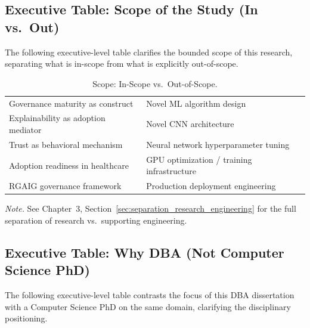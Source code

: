 \subsection{Executive Table: Scope of the Study (In vs.\ Out)}
\label{sec:exec_scope}

\noindent The following executive-level table clarifies the bounded scope of this research, separating what is in-scope from what is explicitly out-of-scope.

{\tablestripes\tablefontsize
{}
\begin{xltabular}{\textwidth}{@{} >{\raggedright\arraybackslash}p{6cm} L @{}}
\caption[Scope: In-Scope vs.\ Out-of-Scope]{Scope: In-Scope vs.\ Out-of-Scope.}\label{tab:exec_scope} \\
\toprule
{} &  \\
\midrule
\endfirsthead
\endhead
\bottomrule
\endlastfoot
Governance maturity as construct & Novel ML algorithm design \\
\addlinespace
Explainability as adoption mediator & Novel CNN architecture \\
\addlinespace
Trust as behavioral mechanism & Neural network hyperparameter tuning \\
\addlinespace
Adoption readiness in healthcare & GPU optimization / training infrastructure \\
\addlinespace
RGAIG governance framework & Production deployment engineering \\
\end{xltabular}}
\vspace{0.3em}\noindent\textit{Note.} See Chapter~3, Section~\ref{sec:separation_research_engineering} for the full separation of research vs.\ supporting engineering.


\subsection{Executive Table: Why DBA (Not Computer Science PhD)}
\label{sec:exec_why_dba}

\noindent The following executive-level table contrasts the focus of this DBA dissertation with a Computer Science PhD on the same domain, clarifying the disciplinary positioning.

